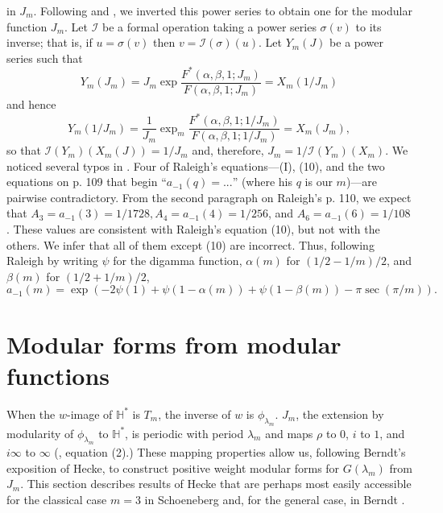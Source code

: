 \documentclass{article}
\begin{document}
in $J_m$.
Following \cite{lehner1954note} and
 \cite{raleigh1962fourier},
we inverted this power series to obtain
one for the modular function $J_m$.
Let $\mathscr{I}$
be a formal operation
taking a power series $\sigma(v)$
to its inverse; that is,
if $u=\sigma(v)$ then 
$v = \mathscr{I}(\sigma)(u)$.
Let  $Y_m(J)$ be a power series
such that
$$ Y_m(J_m) = J_m \exp 
\frac {F^*(\alpha, \beta, 1;J_m)}
{F(\alpha, \beta, 1;J_m)} = 
X_m \left (1/J_m \right )$$
and hence
$$
Y_m(1/J_m) =
\frac 1{J_m} \exp _m
\frac {F^*(\alpha, \beta, 1;1/J_m)}
{F(\alpha, \beta, 1;1/J_m)} = X_m(J_m),$$
so that $\mathscr{I}(Y_m)(X_m(J)) = 1/J_m$
and, therefore,
 $J_m = 1/\mathscr{I}(Y_m)(X_m)$.
 \newline \newline \noindent
We noticed several typos in
\cite{raleigh1962fourier}.
Four of Raleigh's equations---(I), (10), and
the two equations on p. 109
that begin ``$a_{-1}(q) = ...$''
(where his $q$ is our $m$)---are 
pairwise contradictory.
From the second paragraph
on Raleigh's p. 110, we expect that 
$A_3 = a_{-1}(3) = 1/1728, A_4 = a_{-1}(4) = 1/256$, and 
$A_6 = a_{-1}(6) = 1/108$. These values
are consistent with Raleigh's equation 
(10), but not with the others.
We infer that all of them except (10) are incorrect.
Thus, following Raleigh by
writing  $\psi$ for the digamma function,
$\alpha(m)$ for $(1/2-1/m)/2$, and 
$\beta(m)$ for $(1/2+1/m)/2$, 
\begin{equation}
a_{-1}(m) = \exp\left (-2 \psi(1) + \psi(1-\alpha(m))
+\psi(1 - \beta(m))- \pi \sec(\pi/m)
\right ).
\end{equation}
\section{Modular forms 
from modular functions}
When the  
$w$-image of $\mathbb{H}^*$ is
$T_m$, the inverse of $w$ is
$\phi_{\lambda_m}$. 
$J_m$, the extension 
by modularity of $\phi_{\lambda_m}$ to
$\mathbb{H}^*$, is periodic
with period $\lambda_m$ and
maps $\rho$ to $0$, $i$ to $1$, 
and $i\infty$ to $\infty$
(\cite{lehner1954note},
equation (2).)
These mapping properties
allow us, following Berndt's exposition
\cite{berndt2008hecke}
of Hecke,
to construct positive 
weight modular forms for $G(\lambda_m)$
from $J_m$.
This section describes results of Hecke
that are perhaps most easily accessible
for the classical case $m = 3$ 
in Schoeneberg
\cite{schoeneberg1974} and, 
for the general case, in 
 Berndt  \cite{berndt2008hecke}.
\end{document}
